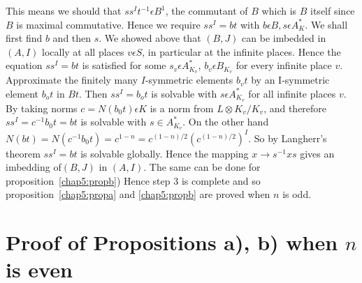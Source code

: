 This means we should that $ss^I t^{-1}\epsilon B^1$, the commutant
of $B$ which is $B$ itself since $B$ is maximal commutative. Hence we
require $ss^I=bt$ with $b\epsilon B, s\epsilon A^*_K$. We shall first
find $b$ and then $s$. We showed above that $(B,J)$ can be imbedded in
$(A,I)$ locally at all places $v\epsilon S$, in particular at the
infinite places. Hence the equation $ss^I=bt$ is satisfied for some
$s_v\epsilon A^*_{K_v}$, $b_v\epsilon B_{K_v}$ for every infinite place
$v$. Approximate the finitely many $I$-symmetric elements $b_vt$ by an
I-symmetric element $b_ot$ in $Bt$. Then $ss^I=b_ot$ is solvable with
$s\epsilon A^*_{K_v}$ for all infinite places $v$. By taking norms
$c=N(b_0t)\epsilon K$ is a norm from  $L\otimes K_v/K_v$, and
therefore $ss^{I} = c^{-1}b_0t = bt$ is solvable with $s \in
A^{*}_{K_{v}}$. On the  other hand $N (bt) = N(c^{-1} b_0 t) = c^{1-n}
= c^{(1-n)/2}(c^{(1-n)/2})^I$. So by Langherr's theorem $ss^I = bt$ is
solvable globally. Hence the mapping $x \rightarrow s^{-1}xs$ gives an
imbedding of\pageoriginale $(B,J)$ in $(A,I)$. The same can be done
for proposition~\ref{chap5:propb}) Hence step 3 is complete and  so 
proposition~\ref{chap5:propa} and  \ref{chap5:propb}
are proved when $n$ is odd. 

\section{Proof of Propositions a), b) when $n$ is even}\label{chap5:sec5.7} 

